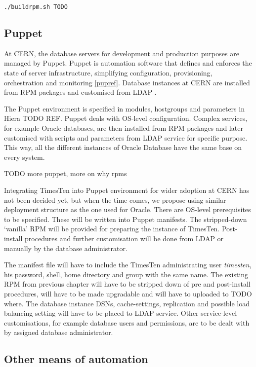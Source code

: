 \documentclass[11pt, letterpaper]{article}
\begin{document}
\begin{lstlisting}
./buildrpm.sh TODO
\end{lstlisting}

\subsection{Puppet}

At CERN, the database servers for development and production purposes are managed by Puppet. Puppet is automation software that defines and enforces the state of server infrastructure, simplifying configuration, provisioning, orchestration and monitoring \ref{pupref}. Database instances at CERN are installed from RPM packages and customised from LDAP .

The Puppet environment is specified in modules, hostgroups and parameters in Hiera TODO REF. Puppet deals with OS-level configuration. Complex services, for example Oracle databases, are then installed from RPM packages and later customised with scripts and parameters from LDAP service for specific purpose. This way, all the different instances of Oracle Database have the same base on every system.

TODO more puppet, more on why rpms

Integrating TimesTen into Puppet environment for wider adoption at CERN has not been decided yet, but when the time comes, we propose using similar deployment structure as the one used for Oracle. There are OS-level prerequisites to be specified. These will be written into Puppet manifests. The stripped-down ‘vanilla’ RPM will be provided for preparing the instance of TimesTen. Post-install procedures and further customisation will be done from LDAP or manually by the database administrator.

The manifest file will have to include the TimesTen administrating user \emph{timesten}, his password, shell, home directory and group with the same name. The existing RPM from previous chapter will have to be stripped down of pre and post-install procedures, will have to be made upgradable and will have to uploaded to TODO where. The database instance DSNs, cache-settings, replication and possible load balancing setting will have to be placed to LDAP service. Other service-level customisations, for example database users and permissions, are to be dealt with by assigned database administrator.

\subsection{Other means of automation}
\end{document}
